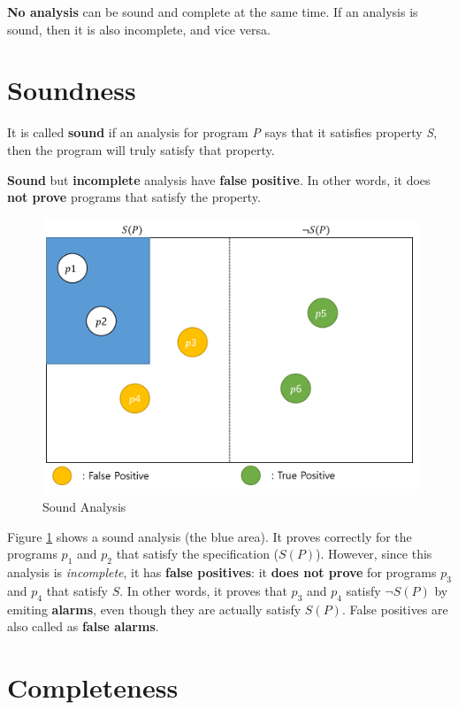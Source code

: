 \documentclass[12pt, twopage]{book}
\begin{document}
\textbf{No analysis} can be sound and complete at the same time. If an
analysis is sound, then it is also incomplete, and vice versa.


\section{Soundness}

It is called \textbf{sound} if an analysis for program \textsl{P} says
that it satisfies property \textsl{S}, then the program will truly
satisfy that property.

\textbf{Sound} but \textbf{incomplete} analysis have \textbf{false
  positive}. In other words, it does \textbf{not prove} programs that
satisfy the property.

\begin{figure}[h]
  \includegraphics[width=\textwidth]{sound}
  \caption{Sound Analysis}
  \label{fig:sound}
\end{figure}

Figure \ref{fig:sound} shows a sound analysis (the blue area). It
proves correctly for the programs $ p_1 $ and $ p_2 $ that satisfy the
specification ($S(P)$). However, since this analysis is
\textit{incomplete}, it has \textbf{false positives}: it \textbf{does
  not prove} for programs $ p_3 $ and $ p_4 $ that satisfy $S$. In
other words, it proves that $ p_3 $ and $ p_4 $ satisfy $ \neg S(P) $
by emiting \textbf{alarms}, even though they are actually satisfy
$ S(P) $. False positives are also called as \textbf{false alarms}.


\section{Completeness}
\end{document}
